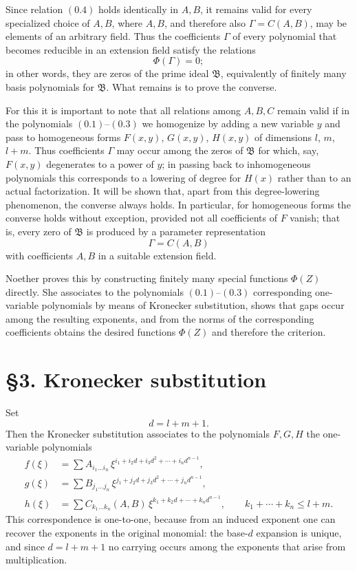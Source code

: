 \documentclass[11pt]{article}
\begin{document}
Since relation \((0.4)\) holds identically in $A,B$, it remains valid for every specialized choice of $A,B$, where $A,B$, and therefore also $\Gamma=C(A,B)$, may be elements of an arbitrary field. Thus the coefficients $\Gamma$ of every polynomial that becomes reducible in an extension field satisfy the relations
\[
\Phi(\Gamma)=0;
\]
in other words, they are zeros of the prime ideal $\mathfrak B$, equivalently of finitely many basis polynomials for $\mathfrak B$. What remains is to prove the converse.

For this it is important to note that all relations among $A,B,C$ remain valid if in the polynomials \((0.1)\)--\((0.3)\) we homogenize by adding a new variable $y$ and pass to homogeneous forms $F(x,y)$, $G(x,y)$, $H(x,y)$ of dimensions $l$, $m$, $l+m$. Thus coefficients $\Gamma$ may occur among the zeros of $\mathfrak B$ for which, say, $F(x,y)$ degenerates to a power of $y$; in passing back to inhomogeneous polynomials this corresponds to a lowering of degree for $H(x)$ rather than to an actual factorization. It will be shown that, apart from this degree-lowering phenomenon, the converse always holds. In particular, for homogeneous forms the converse holds without exception, provided not all coefficients of $F$ vanish; that is, every zero of $\mathfrak B$ is produced by a parameter representation
\[
\Gamma=C(A,B)
\]
with coefficients $A,B$ in a suitable extension field.

Noether proves this by constructing finitely many special functions $\Phi(Z)$ directly. She associates to the polynomials \((0.1)\)--\((0.3)\) corresponding one-variable polynomials by means of Kronecker substitution, shows that gaps occur among the resulting exponents, and from the norms of the corresponding coefficients obtains the desired functions $\Phi(Z)$ and therefore the criterion.

\section*{\S 3. Kronecker substitution}

Set
\[
d=l+m+1.
\tag{0.6}
\]
Then the Kronecker substitution associates to the polynomials $F,G,H$ the one-variable polynomials
\begin{align}
f(\xi) &= \sum A_{i_1\dots i_n}\,\xi^{i_1+i_2d+i_3d^2+\cdots+i_nd^{n-1}}, \tag{0.7}\\
g(\xi) &= \sum B_{j_1\dots j_n}\,\xi^{j_1+j_2d+j_3d^2+\cdots+j_nd^{n-1}}, \tag{0.8}\\
h(\xi) &= \sum C_{k_1\dots k_n}(A,B)\,\xi^{k_1+k_2d+\cdots+k_nd^{n-1}},
\qquad k_1+\cdots+k_n\le l+m. \tag{0.9}
\end{align}
This correspondence is one-to-one, because from an induced exponent one can recover the exponents in the original monomial: the base-$d$ expansion is unique, and since $d=l+m+1$ no carrying occurs among the exponents that arise from multiplication.
\end{document}

